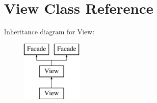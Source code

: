 \section{View Class Reference}
\label{class_view}
Inheritance diagram for View\+:\begin{figure}[H]
\begin{center}
\leavevmode
\includegraphics[height=3.000000cm]{class_view}
\end{center}
\end{figure}
